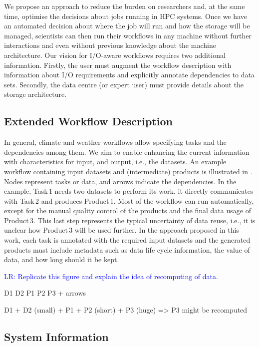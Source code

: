 \documentclass{superfri}
\newcommand{\lr}[1]{\textcolor{blue}{LR: #1}}
\begin{document}
We propose an approach to reduce the burden on researchers and, at the same time, optimise the decisions about jobs running in HPC systems.
Once we have an automated decision about where the job will run and how the storage will be managed, scientists can then run their workflows in any machine without further interactions and even without previous knowledge about the machine architecture.
Our vision for I/O-aware workflows requires two additional information. Firstly, the user must augment the workflow description with information about I/O requirements and explicitly annotate dependencies to data sets. Secondly, the data centre (or expert user) must provide details about the storage architecture.

\subsection{Extended Workflow Description}

In general, climate and weather workflows allow specifying tasks and the dependencies among them.
We aim to enable enhancing the current information with characteristics for input, and output, i.e., the datasets.
An example workflow containing input datasets and (intermediate) products is illustrated in .
Nodes represent tasks or data, and arrows indicate the dependencies.
In the example, Task\,1 needs two datasets to perform its work, it directly communicates with Task\,2 and produces Product\,1.
Most of the workflow can run automatically, except for the manual quality control of the products and the final data usage of Product\,3.
This last step represents the typical uncertainty of data reuse, i.e., it is unclear how Product\,3 will be used further.
In the approach proposed in this work, each task is annotated with the required input datasets and the generated products must include metadata such as data life cycle information, the value of data, and how long should it be kept.


\lr{Replicate this figure and explain the idea of recomputing of data.}

D1 D2 P1 P2 P3 + arrows

D1 + D2 (small) + P1 + P2 (short) + P3 (huge) => P3 might be recomputed

\subsection{System Information}
\end{document}
